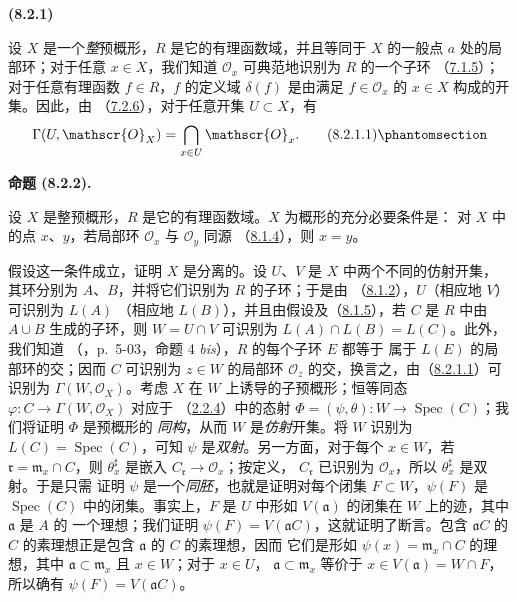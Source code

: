 \documentclass[UTF8,fontset=none,11pt,oneside,openany]{ctexbook}
\newenvironment{env}[1][]{%
  \par\medskip\noindent\textbf{(#1)}\ %
}{\par}
\newenvironment{proposition}[1][]{%
  \par\medskip\noindent\textbf{命题 (#1).}\ %
}{\par}
\newcommand{\oldpage}[2][]{%
  \hypertarget{ega-source-page-#1-#2}{}%
  \marginnote{\scriptsize\textbf{#1}~|~#2}\ignorespaces}
\let\EGAOriginalLabel\label
\renewcommand{\label}[1]{\phantomsection\EGAOriginalLabel{#1}}
\begin{document}
\begin{env}[8.2.1]
\label{I.8.2.1-fr}
设 $X$ 是一个\emph{整}预概形，$R$ 是它的有理函数域，并且等同于
$X$ 的一般点 $a$ 处的局部环；对于任意 $x\in X$，我们知道
$\mathscr{O}_x$ 可典范地识别为 $R$ 的一个子环
（\hyperref[I.7.1.5-fr]{7.1.5}）；对于任意有理函数 $f\in R$，$f$ 的定义域
$\delta(f)$ 是由满足 $f\in\mathscr{O}_x$ 的 $x\in X$ 构成的开集。因此，由
（\hyperref[I.7.2.6-fr]{7.2.6}），对于任意开集 $U\subset X$，有
\begin{equation}
  \Gamma(U,\mathscr{O}_X)=\bigcap_{x\in U}\mathscr{O}_x.
  \tag{8.2.1.1}\label{I.8.2.1.1-fr}
\end{equation}
\end{env}

\oldpage[I]{166}
\begin{proposition}[8.2.2]
\label{I.8.2.2-fr}
设 $X$ 是整预概形，$R$ 是它的有理函数域。$X$ 为概形的充分必要条件是：
对 $X$ 中的点 $x$、$y$，若局部环 $\mathscr{O}_x$ 与 $\mathscr{O}_y$ 同源
（\hyperref[I.8.1.4-fr]{8.1.4}），则 $x=y$。
\end{proposition}

假设这一条件成立，证明 $X$ 是分离的。设 $U$、$V$ 是 $X$ 中两个不同的仿射开集，
其环分别为 $A$、$B$，并将它们识别为 $R$ 的子环；于是由
（\hyperref[I.8.1.2-fr]{8.1.2}），$U$（相应地 $V$）可识别为 $L(A)$
（相应地 $L(B)$），并且由假设及（\hyperref[I.8.1.5-fr]{8.1.5}），若 $C$
是 $R$ 中由 $A\cup B$ 生成的子环，则
$W=U\cap V$ 可识别为 $L(A)\cap L(B)=L(C)$。此外，我们知道
（\cite{I-1}，p.~5-03，命题 4 \emph{bis}），$R$ 的每个子环 $E$ 都等于
属于 $L(E)$ 的局部环的交；因而 $C$ 可识别为 $z\in W$ 的局部环
$\mathscr{O}_z$ 的交，换言之，由（\hyperref[I.8.2.1.1-fr]{8.2.1.1}）可识别为
$\Gamma(W,\mathscr{O}_X)$。考虑 $X$ 在 $W$ 上诱导的子预概形；恒等同态
$\varphi:C\to\Gamma(W,\mathscr{O}_X)$ 对应于
（\hyperref[I.2.2.4-fr]{2.2.4}）中的态射
$\Phi=(\psi,\theta):W\to\operatorname{Spec}(C)$；我们将证明 $\Phi$ 是预概形的
\emph{同构}，从而 $W$ 是\emph{仿射}开集。将 $W$ 识别为
$L(C)=\operatorname{Spec}(C)$，可知 $\psi$ 是\emph{双射}。另一方面，对于每个
$x\in W$，若 $\mathfrak r=\mathfrak m_x\cap C$，则
$\theta_x^\sharp$ 是嵌入 $C_\mathfrak r\to\mathscr{O}_x$；按定义，
$C_\mathfrak r$ 已识别为 $\mathscr{O}_x$，所以 $\theta_x^\sharp$ 是双射。于是只需
证明 $\psi$ 是一个\emph{同胚}，也就是证明对每个闭集
$F\subset W$，$\psi(F)$ 是 $\operatorname{Spec}(C)$ 中的闭集。事实上，$F$ 是
$U$ 中形如 $V(\mathfrak a)$ 的闭集在 $W$ 上的迹，其中 $\mathfrak a$ 是 $A$ 的
一个理想；我们证明 $\psi(F)=V(\mathfrak a C)$，这就证明了断言。包含
$\mathfrak a C$ 的 $C$ 的素理想正是包含 $\mathfrak a$ 的 $C$ 的素理想，因而
它们是形如 $\psi(x)=\mathfrak m_x\cap C$ 的理想，其中
$\mathfrak a\subset\mathfrak m_x$ 且 $x\in W$；对于 $x\in U$，
$\mathfrak a\subset\mathfrak m_x$ 等价于
$x\in V(\mathfrak a)=W\cap F$，所以确有
$\psi(F)=V(\mathfrak a C)$。
\end{document}
